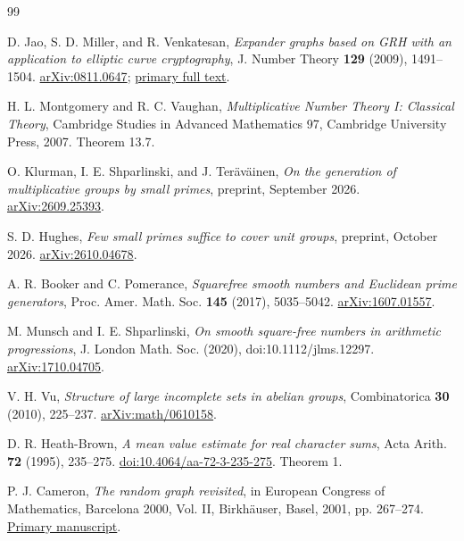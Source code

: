 \documentclass[11pt,a4paper]{article}
\theoremstyle{definition}
\theoremstyle{remark}
\begin{document}
\clearpage
{}
{}
\begin{thebibliography}{99}\small\raggedright

D. Jao, S. D. Miller, and R. Venkatesan,
\emph{Expander graphs based on GRH with an application to elliptic curve
cryptography}, J. Number Theory \textbf{129} (2009), 1491--1504.
\href{https://arxiv.org/abs/0811.0647}{arXiv:0811.0647};
\href{https://arxiv.org/html/0811.0647v2}{primary full text}.

H. L. Montgomery and R. C. Vaughan,
\emph{Multiplicative Number Theory I: Classical Theory},
Cambridge Studies in Advanced Mathematics 97, Cambridge University
Press, 2007. Theorem 13.7.

O. Klurman, I. E. Shparlinski, and J. Ter\"av\"ainen,
\emph{On the generation of multiplicative groups by small primes},
preprint, September 2026.
\href{https://arxiv.org/abs/2609.25393}{arXiv:2609.25393}.

S. D. Hughes, \emph{Few small primes suffice to cover unit groups},
preprint, October 2026.
\href{https://arxiv.org/abs/2610.04678}{arXiv:2610.04678}.

A. R. Booker and C. Pomerance,
\emph{Squarefree smooth numbers and Euclidean prime generators},
Proc. Amer. Math. Soc. \textbf{145} (2017), 5035--5042.
\href{https://arxiv.org/abs/1607.01557}{arXiv:1607.01557}.

M. Munsch and I. E. Shparlinski,
\emph{On smooth square-free numbers in arithmetic progressions},
J. London Math. Soc. (2020), doi:10.1112/jlms.12297.
\href{https://arxiv.org/abs/1710.04705}{arXiv:1710.04705}.

V. H. Vu, \emph{Structure of large incomplete sets in abelian groups},
Combinatorica \textbf{30} (2010), 225--237.
\href{https://arxiv.org/abs/math/0610158}{arXiv:math/0610158}.

D. R. Heath-Brown, \emph{A mean value estimate for real character sums},
Acta Arith. \textbf{72} (1995), 235--275.
\href{https://doi.org/10.4064/aa-72-3-235-275}{doi:10.4064/aa-72-3-235-275}.
Theorem 1.

P. J. Cameron, \emph{The random graph revisited},
in European Congress of Mathematics, Barcelona 2000, Vol. II,
Birkh\"auser, Basel, 2001, pp. 267--274.
\href{https://www.math.uni-bielefeld.de/~rehmann/ECM/cdrom/3ecm/pdfs/pant3/camer.pdf}{Primary manuscript}.


\end{thebibliography}
\end{document}
